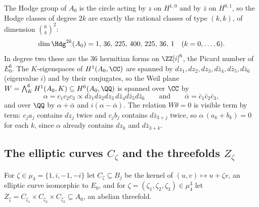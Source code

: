 The Hodge group of $A_{0}$ is the circle acting by $z$ on $H^{1,0}$ and by $\bar z$ on $H^{0,1}$, so the Hodge classes of degree $2k$ are exactly the rational classes of type $(k,k)$, of dimension $\binom{6}{k}^{2}$:
\begin{equation}\label{eq:cmdims}
\dim\Hdg^{2k}(A_{0})=1,\,36,\,225,\,400,\,225,\,36,\,1\quad(k=0,\dots,6).
\end{equation}
In degree two these are the $36$ hermitian forms on $\ZZ[i]^{6}$, the Picard number of $E_{0}^{6}$. The $K$-eigenspaces of $H^{1}(A_{0},\CC)$ are spanned by $dz_{1},dz_{2},dz_{3},d\bar z_{4},d\bar z_{5},d\bar z_{6}$ (eigenvalue $i$) and by their conjugates, so the Weil plane $W=\bigwedge^{6}_{K}H^{1}(A_{0},K)\subseteq H^{6}(A_{0},\QQ)$ is spanned over $\CC$ by
\begin{equation}\label{eq:cmweil}
\alpha=c_{1}c_{2}c_{3}\propto dz_{1}dz_{2}dz_{3}\,d\bar z_{4}d\bar z_{5}d\bar z_{6}\qquad\text{and}\qquad\bar\alpha=\bar c_{1}\bar c_{2}\bar c_{3},
\end{equation}
and over $\QQ$ by $\alpha+\bar\alpha$ and $i(\alpha-\bar\alpha)$. The relation $W\theta=0$ is visible term by term: $c_{j}a_{j}$ contains $dz_{j}$ twice and $c_{j}b_{j}$ contains $d\bar z_{3+j}$ twice, so $\alpha\,(a_{k}+b_{k})=0$ for each $k$, since $\alpha$ already contains $dz_{k}$ and $d\bar z_{3+k}$.

\subsection{The elliptic curves \texorpdfstring{$C_{\zeta}$}{C} and the threefolds \texorpdfstring{$Z_{\zeta}$}{Z}}\label{app:curves}

For $\zeta\in\mu_{4}=\{1,i,-1,-i\}$ let $C_{\zeta}\subseteq B_{j}$ be the kernel of $(u,v)\mapsto u+\zeta v$, an elliptic curve isomorphic to $E_{0}$, and for $\zeta=(\zeta_{1},\zeta_{2},\zeta_{3})\in\mu_{4}^{3}$ let $Z_{\zeta}=C_{\zeta_{1}}\times C_{\zeta_{2}}\times C_{\zeta_{3}}\subseteq A_{0}$, an abelian threefold.


